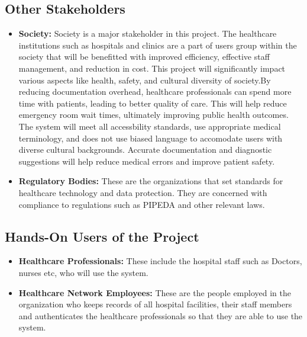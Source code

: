 \documentclass[12pt]{article}
\begin{document}
\subsection{Other Stakeholders}
\begin{itemize}
  \item \textbf{Society:} Society is a major stakeholder in this project. The healthcare institutions such as hospitals and clinics are a part of users group within the society that will be benefitted with improved efficiency, effective staff management, and reduction in cost. This project will significantly impact various aspects like health, safety, and cultural diversity of society.By reducing documentation overhead, healthcare professionals can spend more time with patients, leading to better quality of care. This will help reduce emergency room wait times, ultimately improving public health outcomes. The system will meet all accessbility standards, use appropriate medical terminology, and does not use biased language to accomodate users with diverse cultural backgrounds. Accurate documentation and diagnostic suggestions will help reduce medical errors and improve patient safety.
    

  \item \textbf{Regulatory Bodies:} These are the organizations that set standards for healthcare technology and data protection. They are concerned with compliance to regulations such as PIPEDA and other relevant laws.
\end{itemize}

\subsection{Hands-On Users of the Project}
\begin{itemize}
  \item\textbf{Healthcare Professionals:} These include the hospital staff such as Doctors, nurses etc, who will use the system.
  \item\textbf{Healthcare Network Employees:} These are the people employed in the organization who keeps records of all hospital facilities, their staff members and authenticates the healthcare professionals so that they are able to use the system. 
\end{itemize}
\end{document}

